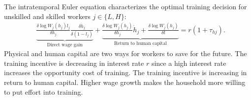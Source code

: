 \documentclass[12pt]{article}
\begin{document}
The intratemporal Euler equation characterizes the optimal training decision for unskilled and skilled workers $j\in\{L,H\}$:
\begin{align*}
&\underbrace{\frac{\delta \log W_j(h_j)l_j}{\delta h_j}\frac{\delta \dot{h}_j}{\delta (1-l_j)}}_{\text{Direct wage gain}}+\underbrace{\frac{\delta \log W_j(h_j)}{\delta h_j}\dot{h}_j+\frac{\delta \log W_j(h_j)}{\delta t}}_{\text{Return to human capital}}= r(1+\tau_{hj}).
\end{align*}
Physical and human capital are two ways for workers to save for the future. The training incentive is decreasing in interest rate $r$ since a high interest rate increases the opportunity cost of training. The training incentive is increasing in return to human capital. Higher wage growth makes the household more willing to put effort into training.
\end{document}
